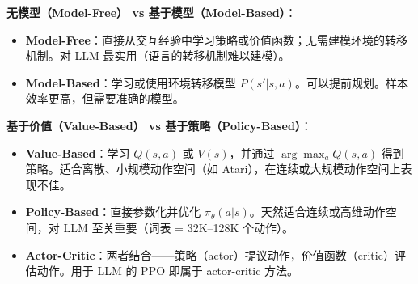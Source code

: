\begin{keybox}[关键分类区分]
\textbf{无模型（Model-Free） vs 基于模型（Model-Based）}：

\begin{itemize}
  \item \textbf{Model-Free}：直接从交互经验中学习策略或价值函数；无需建模环境的转移机制。对 LLM 最实用（语言的转移机制难以建模）。
  \item \textbf{Model-Based}：学习或使用环境转移模型 $P(s'|s,a)$。可以提前规划。样本效率更高，但需要准确的模型。
\end{itemize}

\textbf{基于价值（Value-Based） vs 基于策略（Policy-Based）}：

\begin{itemize}
  \item \textbf{Value-Based}：学习 $Q(s,a)$ 或 $V(s)$，并通过 $\arg\max_a Q(s,a)$ 得到策略。适合离散、小规模动作空间（如 Atari），在连续或大规模动作空间上表现不佳。
  \item \textbf{Policy-Based}：直接参数化并优化 $\pi_\theta(a|s)$。天然适合连续或高维动作空间，对 LLM 至关重要（词表 = 32K--128K 个动作）。
  \item \textbf{Actor-Critic}：两者结合——策略（actor）提议动作，价值函数（critic）评估动作。用于 LLM 的 PPO 即属于 actor-critic 方法。
\end{itemize}


\end{keybox}

